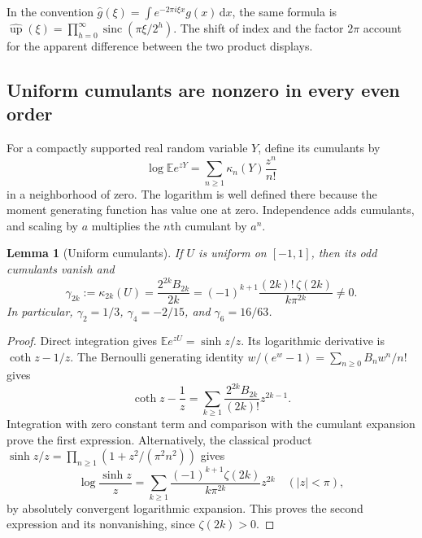 \documentclass[11pt,a4paper]{article}
\numberwithin{equation}{section}
\newtheorem{lemma}[lemma]{Lemma}
\theoremstyle{definition}
\theoremstyle{remark}
\newcommand{\E}{\mathbb E}
\newcommand{\up}{\operatorname{up}}
\newcommand{\sinc}{\operatorname{sinc}}
\newcommand{\dd}{\,\mathrm d}
\newcommand{\kap}{\kappa}
\begin{document}
In the convention $\widehat g(\xi)=\int e^{-2\pi i\xi x}g(x)\dd x$, the same
formula is $\widehat{\up}(\xi)=\prod_{h=0}^\infty\sinc(\pi\xi/2^h)$.
The shift of index and the factor $2\pi$ account for the apparent difference
between the two product displays.

\subsection{Uniform cumulants are nonzero in every even order}
For a compactly supported real random variable $Y$, define its cumulants by
\[
 \log\E e^{zY}=\sum_{n\ge1}\kap_n(Y)\frac{z^n}{n!}
\]
in a neighborhood of zero.  The logarithm is well defined there because the
moment generating function has value one at zero.  Independence adds cumulants,
and scaling by $a$ multiplies the $n$th cumulant by $a^n$.

\begin{lemma}[Uniform cumulants]
\label{lem:uniform}
If $U$ is uniform on $[-1,1]$, then its odd cumulants vanish and
\begin{equation}
 \gamma_{2k}:=\kap_{2k}(U)
 =\frac{2^{2k}B_{2k}}{2k}
 =(-1)^{k+1}\frac{(2k)!\,\zeta(2k)}{k\pi^{2k}}\ne0.
 \label{eq:uniform-cumulants}
\end{equation}
In particular, $\gamma_2=1/3$, $\gamma_4=-2/15$, and $\gamma_6=16/63$.
\end{lemma}
\begin{proof}
Direct integration gives $\E e^{zU}=\sinh z/z$.  Its logarithmic derivative is
$\coth z-1/z$.  The Bernoulli generating identity
$w/(e^w-1)=\sum_{n\ge0}B_nw^n/n!$ gives
\[
 \coth z-\frac1z
 =\sum_{k\ge1}\frac{2^{2k}B_{2k}}{(2k)!}z^{2k-1}.
\]
Integration with zero constant term and comparison with the cumulant expansion
prove the first expression.  Alternatively, the classical product
$\sinh z/z=\prod_{n\ge1}(1+z^2/(\pi^2n^2))$ gives
\[
 \log\frac{\sinh z}{z}
 =\sum_{k\ge1}\frac{(-1)^{k+1}\zeta(2k)}{k\pi^{2k}}z^{2k}
 \quad(|z|<\pi),
\]
by absolutely convergent logarithmic expansion.  This proves the second
expression and its nonvanishing, since $\zeta(2k)>0$.
\end{proof}
\end{document}
